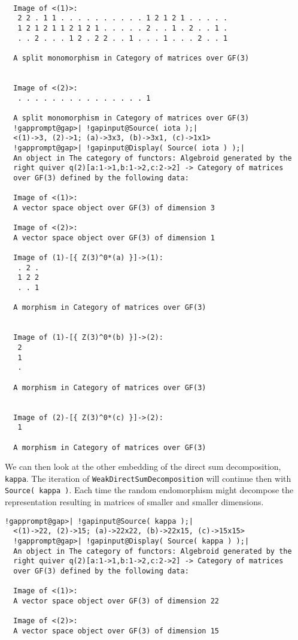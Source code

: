 \begin{computation}
\begin{Verbatim}[commandchars=!@|,fontsize=\small,frame=single,label=Example]
  
  Image of <(1)>:
   2 2 . 1 1 . . . . . . . . . . 1 2 1 2 1 . . . . .
   1 2 1 2 1 1 2 1 2 1 . . . . . 2 . . 1 . 2 . . 1 .
   . . 2 . . . 1 2 . 2 2 . . 1 . . . 1 . . . 2 . . 1
  
  A split monomorphism in Category of matrices over GF(3)
  
  
  Image of <(2)>:
   . . . . . . . . . . . . . . . 1
  
  A split monomorphism in Category of matrices over GF(3)
  !gapprompt@gap>| !gapinput@Source( iota );|
  <(1)->3, (2)->1; (a)->3x3, (b)->3x1, (c)->1x1>
  !gapprompt@gap>| !gapinput@Display( Source( iota ) );|
  An object in The category of functors: Algebroid generated by the
  right quiver q(2)[a:1->1,b:1->2,c:2->2] -> Category of matrices
  over GF(3) defined by the following data:
  
  Image of <(1)>:
  A vector space object over GF(3) of dimension 3
  
  Image of <(2)>:
  A vector space object over GF(3) of dimension 1
  
  Image of (1)-[{ Z(3)^0*(a) }]->(1):
   . 2 .
   1 2 2
   . . 1
  
  A morphism in Category of matrices over GF(3)
  
  
  Image of (1)-[{ Z(3)^0*(b) }]->(2):
   2
   1
   .
  
  A morphism in Category of matrices over GF(3)
  
  
  Image of (2)-[{ Z(3)^0*(c) }]->(2):
   1
  
  A morphism in Category of matrices over GF(3)
\end{Verbatim}
 We can then look at the other embedding of the direct sum decomposition, \texttt{kappa}. The iteration of \texttt{WeakDirectSumDecomposition} will continue then with \texttt{Source( kappa )}. Each time the random endomorphism might decompose the representation resulting in matrices of
 smaller and smaller dimensions.
\begin{Verbatim}[commandchars=!@|,fontsize=\small,frame=single,label=Example]
  !gapprompt@gap>| !gapinput@Source( kappa );|
  <(1)->22, (2)->15; (a)->22x22, (b)->22x15, (c)->15x15>
  !gapprompt@gap>| !gapinput@Display( Source( kappa ) );|
  An object in The category of functors: Algebroid generated by the
  right quiver q(2)[a:1->1,b:1->2,c:2->2] -> Category of matrices
  over GF(3) defined by the following data:
  
  Image of <(1)>:
  A vector space object over GF(3) of dimension 22
  
  Image of <(2)>:
  A vector space object over GF(3) of dimension 15
  

\end{Verbatim}
\end{computation}
